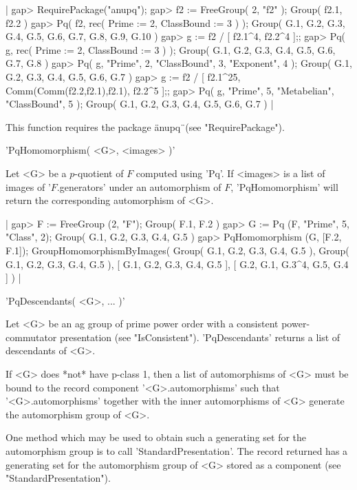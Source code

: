 |    gap> RequirePackage("anupq");
    gap> f2 := FreeGroup( 2, "f2" );
    Group( f2.1, f2.2 )
    gap> Pq( f2, rec( Prime := 2,  ClassBound := 3 ) );
    Group( G.1, G.2, G.3, G.4, G.5, G.6, G.7, G.8, G.9, G.10 )
    gap> g := f2 / [ f2.1^4, f2.2^4 ];;
    gap> Pq( g, rec( Prime := 2, ClassBound := 3 ) );
    Group( G.1, G.2, G.3, G.4, G.5, G.6, G.7, G.8 )
    gap> Pq( g, "Prime", 2, "ClassBound", 3, "Exponent", 4 );
    Group( G.1, G.2, G.3, G.4, G.5, G.6, G.7 )
    gap> g := f2 / [ f2.1^25, Comm(Comm(f2.2,f2.1),f2.1), f2.2^5 ];;
    gap> Pq( g, "Prime", 5, "Metabelian", "ClassBound", 5 );
    Group( G.1, G.2, G.3, G.4, G.5, G.6, G.7 ) |

This function requires the package \"anupq\"\ (see "RequirePackage").


'PqHomomorphism( <G>, <images> )'

Let <G> be a $p$-quotient of $F$ computed  using  'Pq'. If <images>  is a
list  of  images  of  '$F$.generators'  under  an  automorphism  of  $F$,
'PqHomomorphism' will return the corresponding automorphism of <G>.

|    gap> F := FreeGroup (2, "F");
    Group( F.1, F.2 )
    gap> G := Pq (F, "Prime", 5, "Class", 2);
    Group( G.1, G.2, G.3, G.4, G.5 )
    gap> PqHomomorphism (G, [F.2, F.1]);
    GroupHomomorphismByImages( Group( G.1, G.2, G.3, G.4, G.5 ), Group(
    G.1, G.2, G.3, G.4, G.5 ), [ G.1, G.2, G.3, G.4, G.5 ],
    [ G.2, G.1, G.3^4, G.5, G.4 ] ) |


'PqDescendants( <G>, ... )'

Let  <G>  be  an  ag  group  of  prime  power  order  with  a  consistent
power-commutator  presentation   (see  "IsConsistent").   'PqDescendants'
returns a list of descendants of <G>.

If <G>  does  *not* have p-class 1,  then a list of  automorphisms of <G>
must  be  bound  to the  record  component '<G>.automorphisms' such  that
'<G>.automorphisms' together with the inner automorphisms of <G> generate
the automorphism group of <G>.

One method  which  may be  used  to obtain such a generating set  for the
automorphism  group  is  to  call  'StandardPresentation'.   The record
returned has a generating set for the automorphism group of <G> stored as
a component (see "StandardPresentation").

